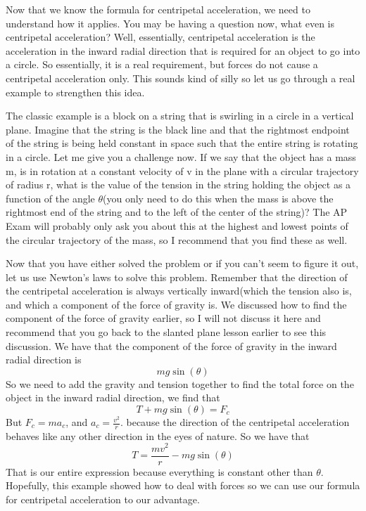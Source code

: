 Now that we know the formula for centripetal acceleration, we need to understand how it applies. You may be having a question now, what even is centripetal acceleration? Well, essentially, centripetal acceleration is the acceleration in the inward radial direction that is required for an object to go into a circle. So essentially, it is a real requirement, but forces do not cause a centripetal acceleration only. This sounds kind of silly so let us go through a real example to strengthen this idea. 

The classic example is a block on a string that is swirling in a circle in a vertical plane. Imagine that the string is the black line and that the rightmost endpoint of the string is being held constant in space such that the entire string is rotating in a circle. Let me give you a challenge now. If we say that the object has a mass m, is in rotation at a constant velocity of v in the plane with a circular trajectory of radius r, what is the value of the tension in the string holding the object as a function of the angle $\theta$(you only need to do this when the mass is above the rightmost end of the string and to the left of the center of the string)? The AP Exam will probably only ask you about this at the highest and lowest points of the circular trajectory of the mass, so I recommend that you find these as well. 

Now that you have either solved the problem or if you can’t seem to figure it out, let us use Newton’s laws to solve this problem. Remember that the direction of the centripetal acceleration is always vertically inward(which the tension also is, and which a component of the force of gravity is. We discussed how to find the component of the force of gravity earlier, so I will not discuss it here and recommend that you go back to the slanted plane lesson earlier to see this discussion. We have that the component of the force of gravity in the inward radial direction is $$mg\sin\left(\theta \right)$$ So we need to add the gravity and tension together to find the total force on the object in the inward radial direction, we find that \begin{equation}T+mg\sin\left(\theta \right)=F_c\end{equation} But $F_c=ma_c$, and $a_c=\frac{v^2}{r}$. because the direction of the centripetal acceleration behaves like any other direction in the eyes of nature. So we have that \begin{equation}T=\frac{mv^2}{r}-mg\sin\left(\theta \right)\end{equation} That is our entire expression because everything is constant other than $\theta$. Hopefully, this example showed how to deal with forces so we can use our formula for centripetal acceleration to our advantage. 